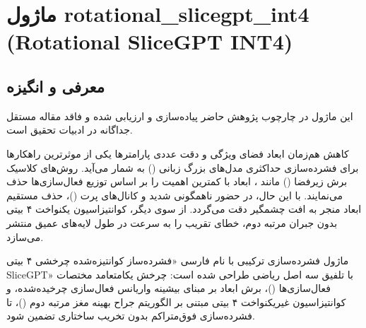 \section{ماژول rotational\_slicegpt\_int4 (Rotational SliceGPT INT4)}
\label{sec:module_rotational_slicegpt_int4}

\subsection{معرفی و انگیزه}
این ماژول در چارچوب پژوهش حاضر پیاده‌سازی و ارزیابی شده و فاقد مقاله مستقل جداگانه در ادبیات تحقیق است.

کاهش هم‌زمان ابعاد فضای ویژگی و دقت عددی پارامترها یکی از موثرترین راهکارها برای فشرده‌سازی حداکثری مدل‌های بزرگ زبانی () به شمار می‌آید. روش‌های کلاسیک برش زیرفضا () مانند ، ابعاد با کمترین اهمیت را بر اساس توزیع فعال‌سازی‌ها حذف می‌نمایند. با این حال، در حضور ناهمگونی شدید و کانال‌های پرت ()، حذف مستقیم ابعاد منجر به افت چشمگیر دقت می‌گردد. از سوی دیگر، کوانتیزاسیون یکنواخت ۴ بیتی بدون جبران مرتبه دوم، خطای تقریب را به سرعت در طول لایه‌های عمیق منتشر می‌سازد.

ماژول فشرده‌سازی ترکیبی  با نام فارسی «فشرده‌ساز کوانتیزه‌شده چرخشی ۴ بیتی SliceGPT» با تلفیق سه اصل ریاضی طراحی شده است: چرخش یکامتعامد مختصات فعال‌سازی‌ها ()، برش ابعاد بر مبنای بیشینه واریانس فعال‌سازی چرخیده‌شده، و کوانتیزاسیون غیریکنواخت ۴ بیتی مبتنی بر الگوریتم جراح بهینه مغز مرتبه دوم ()، تا فشرده‌سازی فوق‌متراکم بدون تخریب ساختاری تضمین شود.

